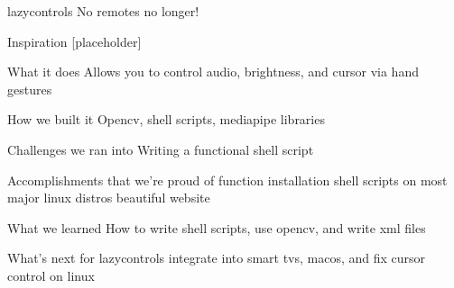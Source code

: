 lazycontrols
No remotes no longer!

Inspiration
[placeholder]

What it does
Allows you to control audio, brightness, and cursor via hand gestures

How we built it
Opencv, shell scripts, mediapipe libraries

Challenges we ran into
Writing a functional shell script

Accomplishments that we're proud of
function installation shell scripts on most major linux distros beautiful website

What we learned
How to write shell scripts, use opencv, and write xml files

What's next for lazycontrols
integrate into smart tvs, macos, and fix cursor control on linux
